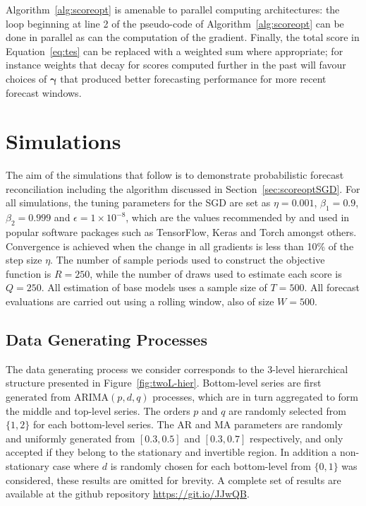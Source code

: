\documentclass[a4paper,12pt]{article}
\theoremstyle{definition}
\begin{document}
Algorithm~\ref{alg:scoreopt} is amenable to parallel computing architectures: the loop beginning at line 2 of the pseudo-code of Algorithm~\ref{alg:scoreopt} can be done in parallel as can the computation of the gradient. Finally, the total score in Equation~\eqref{eq:tes} can be replaced with a weighted sum where appropriate; for instance weights that decay for scores computed further in the past will favour choices of $\bm{\gamma}$ that produced better forecasting performance for more recent forecast windows.

\section{Simulations}\label{sec:simulations}

The aim of the simulations that follow is to demonstrate probabilistic forecast reconciliation including the algorithm discussed in Section~\ref{sec:scoreoptSGD}. For all simulations, the tuning parameters for the SGD are set as $\eta=0.001$, $\beta_1=0.9$, $\beta_2=0.999$ and $\epsilon=1\times 10^{-8}$, which are the values recommended by \cite{kingma2014} and used in popular software packages such as TensorFlow, Keras and Torch amongst others. Convergence is achieved when the change in all gradients is less than 10\% of the step size $\eta$. The number of sample periods used to construct the objective function is $R=250$, while the number of draws used to estimate each score is $Q=250$. All estimation of base models uses a sample size of $T=500$. All forecast evaluations are carried out using a rolling window, also of size $W=500$.

\subsection{Data Generating Processes}\label{sec:dgp}

The data generating process we consider corresponds to the 3-level hierarchical structure presented in Figure~\ref{fig:twoL-hier}. Bottom-level series are first generated from ARIMA$(p,d,q)$ processes, which are in turn aggregated to form the middle and top-level series. The orders $p$ and $q$ are randomly selected from $\{1,2\}$ for each bottom-level series. The AR and MA parameters are randomly and uniformly generated from $[0.3,0.5]$ and $[0.3,0.7]$ respectively, and only accepted if they belong to the stationary and invertible region. In addition a non-stationary case where $d$ is randomly chosen for each bottom-level from $\{0,1\}$ was considered, these results are omitted for brevity. A complete set of results are available at the github repository \url{https://git.io/JJwQB}.
\end{document}

